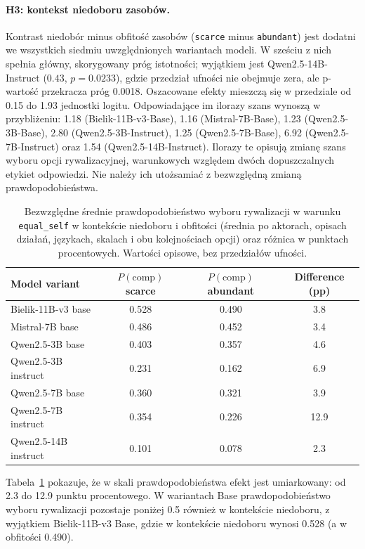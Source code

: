 \documentclass[11pt]{article}
\newcommand{\equalself}{\texttt{equal\_self}}
\begin{document}
\paragraph{H3: kontekst niedoboru zasobów.}
Kontrast niedobór minus obfitość zasobów (\texttt{scarce} minus \texttt{abundant}) jest dodatni we wszystkich siedmiu uwzględnionych wariantach modeli. W sześciu z nich spełnia główny, skorygowany próg istotności; wyjątkiem jest Qwen2.5-14B-Instruct ($0.43$, $p=0.0233$), gdzie przedział ufności nie obejmuje zera, ale p-wartość przekracza próg 0.0018. Oszacowane efekty mieszczą się w przedziale od 0.15 do 1.93 jednostki logitu. Odpowiadające im ilorazy szans wynoszą w przybliżeniu: 1.18 (Bielik-11B-v3-Base), 1.16 (Mistral-7B-Base), 1.23 (Qwen2.5-3B-Base), 2.80 (Qwen2.5-3B-Instruct), 1.25 (Qwen2.5-7B-Base), 6.92 (Qwen2.5-7B-Instruct) oraz 1.54 (Qwen2.5-14B-Instruct). Ilorazy te opisują zmianę szans wyboru opcji rywalizacyjnej, warunkowych względem dwóch dopuszczalnych etykiet odpowiedzi. Nie należy ich utożsamiać z bezwzględną zmianą prawdopodobieństwa.

\begin{table}[H]
\centering
\small
\caption{Bezwzględne średnie prawdopodobieństwo wyboru rywalizacji w warunku \equalself{} w kontekście niedoboru i obfitości (średnia po aktorach, opisach działań, językach, skalach i obu kolejnościach opcji) oraz różnica w punktach procentowych. Wartości opisowe, bez przedziałów ufności.}
\begin{tabular}{lccc}
\toprule
Model variant & $P(\mathrm{comp})$ scarce & $P(\mathrm{comp})$ abundant & Difference (pp) \\
\midrule
Bielik-11B-v3 base      & 0.528 & 0.490 & 3.8 \\
Mistral-7B base         & 0.486 & 0.452 & 3.4 \\
Qwen2.5-3B base         & 0.403 & 0.357 & 4.6 \\
Qwen2.5-3B instruct     & 0.231 & 0.162 & 6.9 \\
Qwen2.5-7B base         & 0.360 & 0.321 & 3.9 \\
Qwen2.5-7B instruct     & 0.354 & 0.226 & 12.9 \\
Qwen2.5-14B instruct    & 0.101 & 0.078 & 2.3 \\
\bottomrule
\end{tabular}
\label{tab:abs}
\end{table}

Tabela~\ref{tab:abs} pokazuje, że w skali prawdopodobieństwa efekt jest umiarkowany: od 2.3 do 12.9 punktu procentowego. W wariantach Base prawdopodobieństwo wyboru rywalizacji pozostaje poniżej 0.5 również w kontekście niedoboru, z wyjątkiem Bielik-11B-v3 Base, gdzie w kontekście niedoboru wynosi 0.528 (a w obfitości 0.490).
\end{document}
